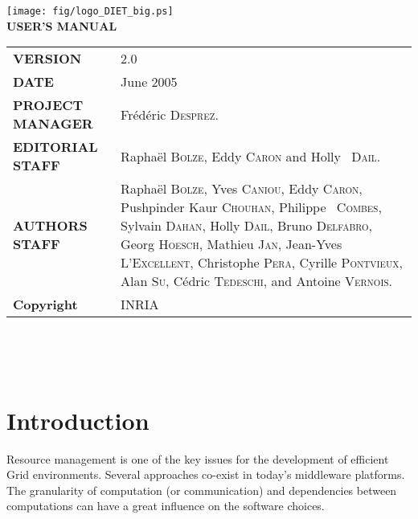 \documentclass[12pt,a4paper]{book}
\newcommand{\dietversion}{2.0}
\begin{document}

\thispagestyle{empty}
\vspace*{3cm}
\vspace*{3cm}

\begin{center}
\texttt{[image: fig/logo\_DIET\_big.ps]}\\[2ex]
\textbf{\Huge USER'S MANUAL\\[2ex]}
\end{center}

\vfill

\noindent
\small{
\begin{tabular}{ll}
  \textbf{VERSION}  & \dietversion\\
  \textbf{DATE}     & June 2005\\
  \textbf{PROJECT MANAGER}  & Fr\'ed\'eric \textsc{Desprez}.\\
  \textbf{EDITORIAL STAFF}  & Rapha\"el \textsc{Bolze}, Eddy \textsc{Caron} and Holly ~\textsc{Dail}.\\
  \textbf{AUTHORS STAFF}    & 
\begin{minipage}[t]{12cm}
  Rapha\"el \textsc{Bolze}, Yves \textsc{Caniou}, Eddy \textsc{Caron},
  Pushpinder Kaur \textsc{Chouhan}, Philippe ~\textsc{Combes}, Sylvain
  \textsc{Dahan}, Holly \textsc{Dail}, Bruno \textsc{Delfabro}, Georg
  \textsc{Hoesch}, Mathieu \textsc{Jan}, Jean-Yves
  \textsc{L'Excellent}, Christophe \textsc{Pera}, Cyrille
  \textsc{Pontvieux}, Alan \textsc{Su}, C\'edric \textsc{Tedeschi},
  and Antoine \textsc{Vernois}.
\end{minipage} \\
  \textbf{Copyright}& INRIA
\end{tabular}\\
}

\newpage
\thispagestyle{empty}
\ 



\newpage
\tableofcontents


%
%
\newpage
{}
\chapter*{Introduction}

Resource management is one of the key issues for the development of
efficient Grid environments. Several approaches co-exist in today's
middleware platforms. The granularity of computation (or communication) and 
dependencies between computations can have a great influence on the
software choices.
\end{document}
